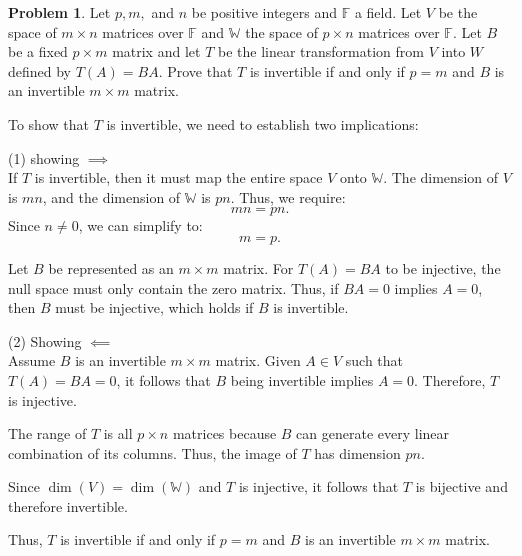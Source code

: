 \documentclass[12pt]{article}
\theoremstyle{definition}
\newtheorem{problem}{Problem}
\begin{document}
\begin{problem}
    Let $p, m,$ and $n$ be positive integers and $\mathbb{F}$ a field. Let $V$ be the space of $m \times n$
    matrices over $\mathbb{F}$ and $\mathbb{W}$ the space of $p \times n$ matrices over $\mathbb{F}$. Let $B$ 
    be a fixed $p \times m$ matrix and let $T$ be the linear transformation from $V$ into $W$ defined by 
    $T(A) = BA$. Prove that $T$ is invertible if and only if $p = m$ and $B$ is an invertible $m \times m$ matrix. 

    \begin{solution}
        To show that \( T \) is invertible, we need to establish two implications:

        (1) showing $\implies$\\
        If \( T \) is invertible, then it must map the entire space \( V \) onto \( \mathbb{W} \). The dimension of \( V \) is \( mn \), and the dimension of \( \mathbb{W} \) is \( pn \). Thus, we require:
        \[
        mn = pn.
        \]
        Since \( n \neq 0 \), we can simplify to:
        \[
        m = p.
        \]

        Let \( B \) be represented as an \( m \times m \) matrix. For \( T(A) = BA \) to be injective, the null space must only contain the zero matrix. Thus, if \( BA = 0 \) implies \( A = 0 \), then \( B \) must be injective, which holds if \( B \) is invertible.

        (2) Showing $\impliedby$\\
        Assume \( B \) is an invertible \( m \times m \) matrix. Given \( A \in V \) such that \( T(A) = BA = 0 \), it follows that \( B \) being invertible implies \( A = 0 \). Therefore, \( T \) is injective.

        The range of \( T \) is all \( p \times n \) matrices because \( B \) can generate every linear combination of its columns. Thus, the image of \( T \) has dimension \( pn \).

        Since \( \dim(V) = \dim(\mathbb{W}) \) and \( T \) is injective, it follows that \( T \) is bijective and therefore invertible.

        Thus, \( T \) is invertible if and only if \( p = m \) and \( B \) is an invertible \( m \times m \) matrix.
    
    \end{solution}
\end{problem}
\end{document}
